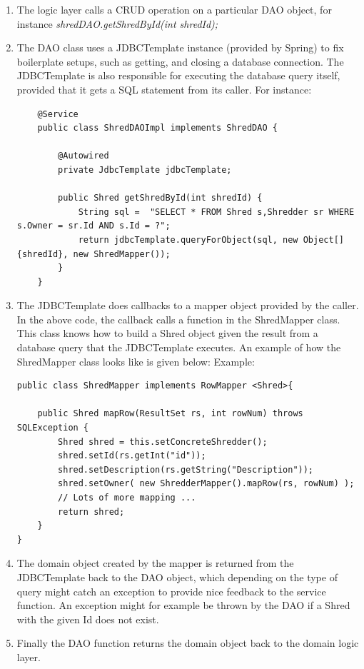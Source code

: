 \begin{enumerate}
\item{} The logic layer calls a CRUD operation on a particular DAO object, for instance \textit{shredDAO.getShredById(int shredId); }
\item{} The DAO class uses a JDBCTemplate instance (provided by Spring) to fix boilerplate setups, such as getting, and closing a database connection. The JDBCTemplate is also responsible for executing the database query itself, provided that it gets a SQL statement from its caller. For instance: 
	\begin{lstlisting}
	@Service
	public class ShredDAOImpl implements ShredDAO {
	
		@Autowired
		private JdbcTemplate jdbcTemplate;
		
		public Shred getShredById(int shredId) {
			String sql =  "SELECT * FROM Shred s,Shredder sr WHERE s.Owner = sr.Id AND s.Id = ?";
			return jdbcTemplate.queryForObject(sql, new Object[]{shredId}, new ShredMapper());
		}
	}	
\end{lstlisting}
\item{} The JDBCTemplate does callbacks to a mapper object provided by the caller. In the above code, the callback calls a function in the ShredMapper class. This class knows how to build a Shred object given the result from a database query that the JDBCTemplate executes. An example of how the ShredMapper class looks like is given below:
Example:
\begin{lstlisting}
public class ShredMapper implements RowMapper <Shred>{
	
	public Shred mapRow(ResultSet rs, int rowNum) throws SQLException {
		Shred shred = this.setConcreteShredder();
		shred.setId(rs.getInt("id"));
		shred.setDescription(rs.getString("Description"));
		shred.setOwner( new ShredderMapper().mapRow(rs, rowNum) );
		// Lots of more mapping ...
		return shred;
	}
}

\end{lstlisting}	
\item{} The domain object created by the mapper is returned from the JDBCTemplate back to the DAO object, which depending on the type of query might catch an exception to provide nice feedback to the service function. An exception might for example be thrown by the DAO if a Shred with the given Id does not exist.
\item{} Finally the DAO function returns the domain object back to the domain logic layer. 
\end{enumerate}	

